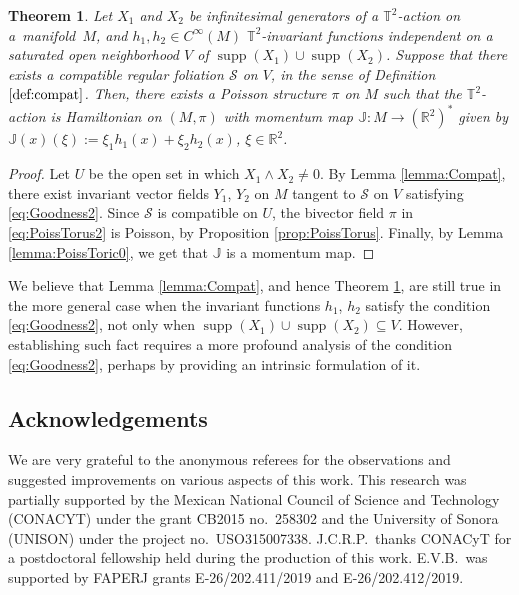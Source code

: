 \documentclass[10pt,a4paper]{amsart}
\newcommand{\R}[1]{\mathbb{R}^{#1}}
\numberwithin{equation}{section}
\newtheorem{Theorem}{Theorem}[section]
\begin{document}
{\sloppy\begin{Theorem}\label{teo:2Torus}
Let $X_1$ and $X_{2}$ be infinitesimal generators of a $\mathbb{T}^{2}$-action on a~manifold~$M$, and $h_{1},h_{2} \in C^{\infty}(M)$ $\mathbb{T}^{2}$-invariant functions independent on a saturated open neighborhood $V$ of $\operatorname{supp}(X_1) \cup \operatorname{supp}(X_2)$. Suppose that there exists a compatible regular foliation $\mathcal{S}$ on $V$, in the sense of Definition $\ref{def:compat}$. Then, there exists a Poisson structure $\pi$ on $M$ such that the $\mathbb{T}^{2}$-action is Hamiltonian on $(M,\pi)$ with momentum map $\mathbb{J}\colon M \to (\R{2})^{*}$ given by $\mathbb{J}(x)(\xi) := \xi_1 h_1(x) + \allowbreak\xi_2h_2(x)$, $\xi \in \R{2}$.
\end{Theorem}}

\begin{proof}
Let $U$ be the open set in which $X_1 \wedge X_2\neq 0$. By Lemma \ref{lemma:Compat}, there exist invariant vector fields $Y_1$, $Y_2$ on $M$ tangent to $\mathcal{S}$ on $V$ satisfying \eqref{eq:Goodness2}. Since $\mathcal{S}$ is compatible on $U$, the bivector field $\pi$ in \eqref{eq:PoissTorus2} is Poisson, by Proposition \ref{prop:PoissTorus}. Finally, by Lemma \ref{lemma:PoissToric0}, we get that $\mathbb{J}$ is a momentum map.
\end{proof}

\begin{Remark}
We believe that Lemma \ref{lemma:Compat}, and hence Theorem \ref{teo:2Torus}, are still true in the more general case when the invariant functions $h_1$, $h_2$ satisfy the condition \eqref{eq:Goodness2}, not only when $\operatorname{supp}(X_1) \cup \operatorname{supp}(X_2) \subseteq V$. However, establishing such fact requires a more profound analysis of the condition \eqref{eq:Goodness2}, perhaps by providing an intrinsic formulation of it.
\end{Remark}

\subsection*{Acknowledgements}

We are very grateful to the anonymous referees for the observations and suggested improvements on various aspects of this work.
This research was partially supported by the Mexican National Council of Science and Technology (CONACYT) under the grant CB2015 no.~258302 and the University of Sonora (UNISON) under the project no.~USO315007338.
J.C.R.P.\ thanks CONACyT for a postdoctoral fellowship held during the production of this work.
E.V.B.\ was supported by FAPERJ grants E-26/202.411/2019 and E-26/202.412/2019.
\end{document}
